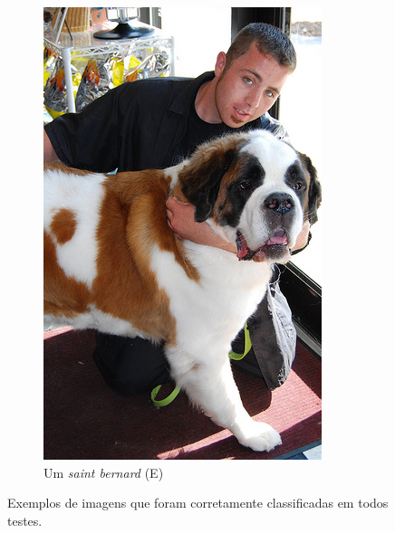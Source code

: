 \begin{figure}
\begin{subfigure}[b]{0.4\textwidth}
    \includegraphics[width=\textwidth]{saint_bernard_good.jpg}
    \caption{Um \textit{saint bernard} (E)}
  \end{subfigure}
  \caption{Exemplos de imagens que foram corretamente classificadas em todos testes.}
  \label{fig:perfectgood}
\end{figure}


